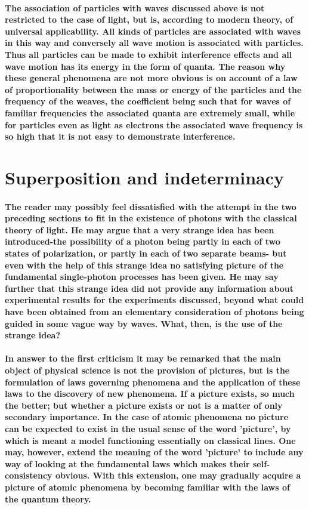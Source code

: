\documentclass[10pt, kindle, oneside]{kindle}
\begin{document}
\paragraph{The association of particles with waves discussed above is not restricted to the case of light, but is, according to modern theory, of universal applicability. All kinds of particles are associated with waves in this way and conversely all wave motion is associated with particles. Thus all particles can be made to exhibit interference effects and all wave motion has its energy in the form of quanta. The reason why these general phenomena are not more obvious is on account of a law of proportionality between the mass or energy of the particles and the frequency of the weaves, the coefficient being such that for waves of familiar frequencies the associated quanta are extremely small, while for particles even as light as electrons the associated wave frequency is so high that it is not easy to demonstrate interference.}
\section{Superposition and indeterminacy}
\paragraph{The reader may possibly feel dissatisfied with the attempt in the two preceding sections to fit in the existence of photons with the classical theory of light. He may argue that a very strange idea has been introduced-the possibility of a photon being partly in each of two states of polarization, or partly in each of two separate beams- but even with the help of this strange idea no satisfying picture of the fundamental single-photon processes has been given. He may say further that this strange idea did not provide any information about experimental results for the experiments discussed, beyond what could have been obtained from an elementary consideration of photons being guided in some vague way by waves. What, then, is the use of the strange idea?}
\paragraph{In answer to the first criticism it may be remarked that the main object of physical science is not the provision of pictures, but is the formulation of laws governing phenomena and the application of these laws to the discovery of new phenomena. If a picture exists, so much the better; but whether a picture exists or not is a matter of only secondary importance. In the case of atomic phenomena no picture can be expected to exist in the usual sense of the word 'picture', by which is meant a model functioning essentially on classical lines. One may, however, extend the meaning of the word 'picture' to include any way of looking at the fundamental laws which makes their self-consistency obvious. With this extension, one may gradually acquire a picture of atomic phenomena by becoming familiar with the laws of the quantum theory.}
\end{document}
